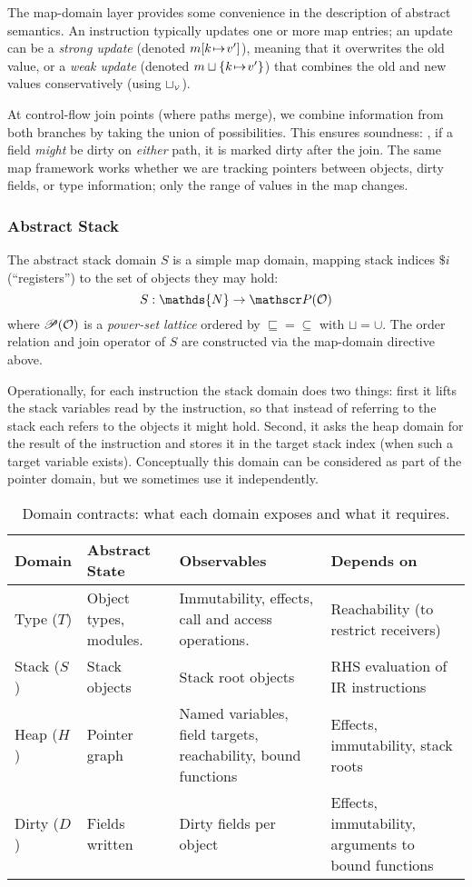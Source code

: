The map-domain layer provides some convenience in the description of abstract semantics.
An instruction typically updates one or more map entries;
an update can be a \emph{strong update} (denoted $m[k{\hspace{1pt}\mapsto\hspace{1pt}} v']$), meaning that it overwrites the old value,
or a \emph{weak update} (denoted $m\sqcup \{k{\hspace{1pt}\mapsto\hspace{1pt}} v'\}$) that
combines the old and new values conservatively (using $\sqcup_{\scriptscriptstyle\mathcal{V}}$).

At control-flow join points (where paths merge), we combine information from both branches by taking the union of possibilities. This ensures soundness: \eg, if a field \emph{might} be dirty on \emph{either} path, it is marked dirty after the join. The same map framework works whether we are tracking pointers between objects, dirty fields, or type information; only the range of values in the map changes.

\subsubsection*{Abstract Stack} The abstract stack domain $S$ is a simple map domain, mapping stack indices $\$i$ (``registers'') to the set of objects they may hold:
\[S : \mathds{N} \to \powerset(\tO)\]
%
where $\mathscr{P}(\mathcal{O})$ is a \emph{power-set lattice} ordered by ${\sqsubseteq}={\subseteq}$ with ${\sqcup}={\cup}$.
The order relation and join operator of $S$ are constructed via the map-domain
directive above.

Operationally, for each instruction the stack domain does two things: first it lifts the stack variables read by the instruction, so that instead of referring to the stack each refers to the objects it might hold. Second, it asks the heap domain for the result of the instruction and stores it in the target stack index (when such a target variable exists). Conceptually this domain can be considered as part of the pointer domain, but we sometimes use it independently.

\begin{table}[t]
\centering
\small
\begin{tabular}{p{15mm}p{20mm}p{33mm}p{42mm}}
\toprule
\textbf{Domain} & \textbf{Abstract State} & \textbf{Observables} & \textbf{Depends on} \\
\midrule
Type ($T$) &
  Object types, modules. &
  Immutability, effects, call and access operations. &
  Reachability (to restrict receivers) \\
\addlinespace
Stack ($S$) & Stack objects
  & Stack root objects & RHS evaluation of IR instructions \\
\addlinespace
Heap ($H$) &
  Pointer graph
  &
  Named variables, field targets, reachability, bound functions &
  Effects, immutability, stack roots \\
\addlinespace
Dirty ($D$) &
  Fields written &
  Dirty fields per object &
  Effects,  immutability, arguments to bound functions \\
\bottomrule
\end{tabular}
\caption{Domain contracts: what each domain exposes and what it requires.}
\label{tab:contracts}
\end{table}

